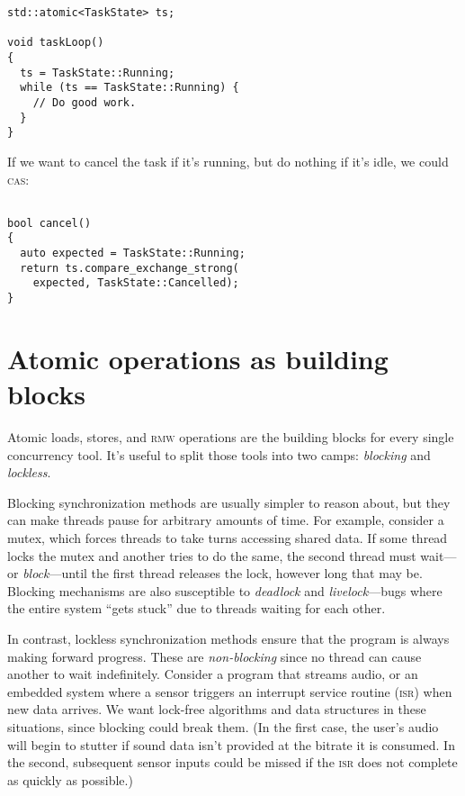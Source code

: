 \documentclass[fontsize=\bodyfontsize, numbers=endperiod]{scrartcl}
\newcommand{\codesize}{\fontsize{\bodyfontsize}{\bodybaselineskip}}
\newcommand{\introduce}[1]{\textit{#1}}
\newenvironment{colfigure}
  {\par\vspace{1\baselineskip minus 0.5\baselineskip}\noindent\minipage{\linewidth}}
  {\endminipage\vspace{1\baselineskip minus 0.7\baselineskip}}
\begin{document}
\begin{multicols}{2}
\begin{colfigure}
\begin{verbatim}
std::atomic<TaskState> ts;

void taskLoop()
{
  ts = TaskState::Running;
  while (ts == TaskState::Running) {
    // Do good work.
  }
}
\end{verbatim}
\end{colfigure}
If we want to cancel the task if it's running, but do nothing if it's idle,
we could \textsc{cas}:
\begin{colfigure}
\begin{verbatim}

bool cancel()
{
  auto expected = TaskState::Running;
  return ts.compare_exchange_strong(
    expected, TaskState::Cancelled);
}
\end{verbatim}
\end{colfigure}

\section{Atomic operations as building blocks}

Atomic loads, stores, and \textsc{rmw} operations are the building
blocks for every single concurrency tool.
It's useful to split those tools into two camps:
\introduce{blocking} and \introduce{lockless}.

Blocking synchronization methods are usually simpler to reason about,
but they can make threads pause for arbitrary amounts of time.
For example, consider a mutex,
which forces threads to take turns accessing shared data.
If some thread locks the mutex
and another tries to do the same,
the second thread must wait---or \introduce{block}---until
the first thread releases the lock,
however long that may be.
Blocking mechanisms are also susceptible to \introduce{deadlock} and
\introduce{livelock}---bugs where the entire system ``gets stuck''
due to threads waiting for each other.

In contrast, lockless synchronization methods
ensure that the program is always making forward progress.
These are \introduce{non-blocking}
since no thread can cause another to wait indefinitely.
Consider a program that streams audio,
or an embedded system where a sensor triggers an interrupt service routine
\textsc{(isr)} when new data arrives.
We want lock-free algorithms and data structures in these situations,
since blocking could break them.
(In the first case, the user's audio will begin to stutter if sound data
isn't provided at the bitrate it is consumed.
In the second, subsequent sensor inputs could be missed if the \textsc{isr}
does not complete as quickly as possible.)


\end{multicols}
\end{document}
